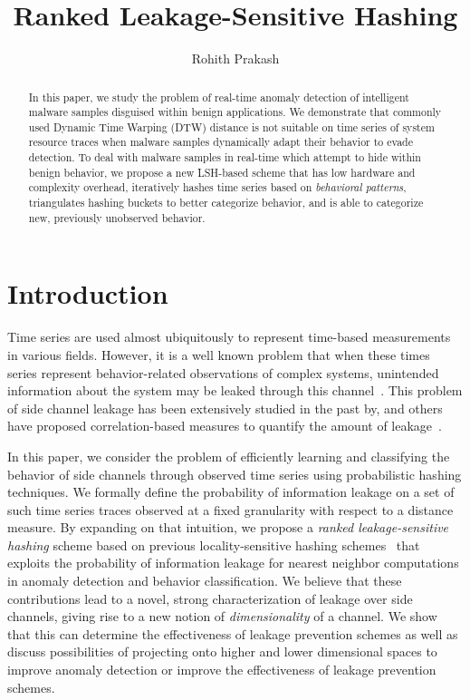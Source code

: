 \documentclass[a4paper]{article}
\title{Ranked Leakage-Sensitive Hashing}
\author{Rohith Prakash}
\date{}
\theoremstyle{def}
\theoremstyle{thm}
\begin{document}
\maketitle{}

\begin{abstract}
    In this paper, we study the problem of real-time anomaly detection of intelligent malware samples disguised within benign applications. 
    We demonstrate that commonly used Dynamic Time Warping (DTW) distance is not suitable on time series of system resource traces when malware samples dynamically adapt their behavior to evade detection.
    To deal with malware samples in real-time which attempt to hide within benign behavior, we propose a new LSH-based scheme that has low hardware and complexity overhead, iteratively hashes time series based on \textit{behavioral patterns}, triangulates hashing buckets to better categorize behavior, and is able to categorize new, previously unobserved behavior.
\end{abstract}

\section{Introduction}
\label{sec:intro}

Time series are used almost ubiquitously to represent time-based measurements in various fields.
However, it is a well known problem that when these times series represent behavior-related observations of complex systems, unintended information about the system may be leaked through this channel~\cite{DBLP:conf/ccs/RistenpartTSS09,DBLP:conf/sp/ZhangJOR11}.
This problem of side channel leakage has been extensively studied in the past by, and others have proposed correlation-based measures to quantify the amount of leakage~\cite{demme2012,zhang2013}.

In this paper, we consider the problem of efficiently learning and classifying the behavior of side channels through observed time series using probabilistic hashing techniques.
We formally define the probability of information leakage on a set of such time series traces observed at a fixed granularity with respect to a distance measure.
By expanding on that intuition, we propose a \textit{ranked leakage-sensitive hashing} scheme based on previous locality-sensitive hashing schemes~\cite{Kulis12-KLSH,Jiang15-KLSH,Kim16-SLSH} that exploits the probability of information leakage for nearest neighbor computations in anomaly detection and behavior classification.
We believe that these contributions lead to a novel, strong characterization of leakage over side channels, giving rise to a new notion of \textit{dimensionality} of a channel.
We show that this can determine the effectiveness of leakage prevention schemes as well as discuss possibilities of projecting onto higher and lower dimensional spaces to improve anomaly detection or improve the effectiveness of leakage prevention schemes.
\end{document}
